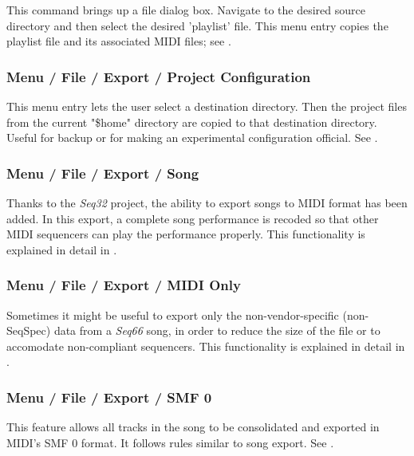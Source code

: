    This command brings up a file dialog box. Navigate to the desired
   source directory and then select the desired 'playlist' file.
   This menu entry copies the playlist file and its associated
   MIDI files; see
   .

\subsubsection{Menu / File / Export / Project Configuration}
\label{subsubsec:menu_file_export_project}

   This menu entry lets the user select a destination directory.
   Then the project files from the current "\$home" directory are copied
   to that destination directory. Useful for backup or for making
   an experimental configuration official.
   See .

\subsubsection{Menu / File / Export / Song}
\label{subsubsec:menu_file_export_song_as_midi}

   Thanks to the \textsl{Seq32} project, the ability to export songs to MIDI
   format has been added.  In this export, a complete song performance is
   recoded so that other MIDI sequencers can play the performance properly.
   This functionality is explained in detail in
   .

\subsubsection{Menu / File / Export / MIDI Only}
\label{subsubsec:menu_file_export_midi_only}

   Sometimes it might be useful to export only the non-vendor-specific
   (non-SeqSpec) data from a \textsl{Seq66} song, in order to reduce the
   size of the file or to accomodate non-compliant sequencers.
   This functionality is explained in detail in
   .

\subsubsection{Menu / File / Export / SMF 0}
\label{subsubsec:menu_file_export_smf_0}

   This feature allows all tracks in the song to
   be consolidated and exported in MIDI's SMF 0 format.
   It follows rules similar to song export.
   See .

